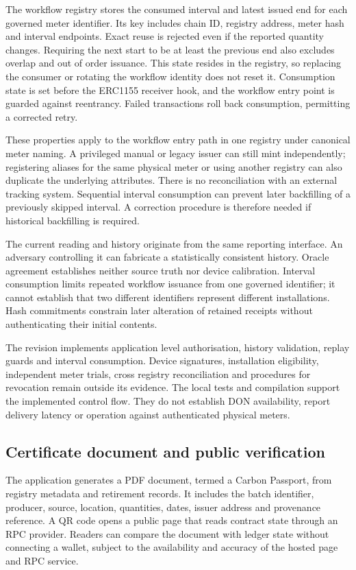 \documentclass[11pt,a4paper]{article}
\begin{document}
The workflow registry stores the consumed interval and latest issued end for each governed meter identifier. Its key includes chain ID, registry address, meter hash and interval endpoints. Exact reuse is rejected even if the reported quantity changes. Requiring the next start to be at least the previous end also excludes overlap and out of order issuance. This state resides in the registry, so replacing the consumer or rotating the workflow identity does not reset it. Consumption state is set before the ERC1155 receiver hook, and the workflow entry point is guarded against reentrancy. Failed transactions roll back consumption, permitting a corrected retry.

These properties apply to the workflow entry path in one registry under canonical meter naming. A privileged manual or legacy issuer can still mint independently; registering aliases for the same physical meter or using another registry can also duplicate the underlying attributes. There is no reconciliation with an external tracking system. Sequential interval consumption can prevent later backfilling of a previously skipped interval. A correction procedure is therefore needed if historical backfilling is required.



The current reading and history originate from the same reporting interface. An adversary controlling it can fabricate a statistically consistent history. Oracle agreement establishes neither source truth nor device calibration. Interval consumption limits repeated workflow issuance from one governed identifier; it cannot establish that two different identifiers represent different installations. Hash commitments constrain later alteration of retained receipts without authenticating their initial contents.

The revision implements application level authorisation, history validation, replay guards and interval consumption. Device signatures, installation eligibility, independent meter trials, cross registry reconciliation and procedures for revocation remain outside its evidence. The local tests and compilation support the implemented control flow. They do not establish DON availability, report delivery latency or operation against authenticated physical meters.

\subsection{Certificate document and public verification}
The application generates a PDF document, termed a Carbon Passport, from registry metadata and retirement records. It includes the batch identifier, producer, source, location, quantities, dates, issuer address and provenance reference. A QR code opens a public page that reads contract state through an RPC provider. Readers can compare the document with ledger state without connecting a wallet, subject to the availability and accuracy of the hosted page and RPC service.
\end{document}
